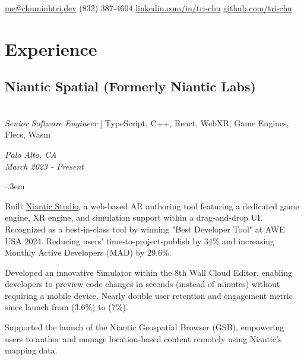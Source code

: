 \documentclass{article}
\makeatletter
\def\faEmail{{\FAFR \symbol{"F0E0}}} %
\def\faPhone{{\FAFR \symbol{"F095}}} %
\def\faLinkedin{{\FAB \symbol{"F08C}}} %
\def\faGithub{{\FAB \symbol{"F09B}}} %
\let\olditemize=\itemize \let\endolditemize=\enditemize
\renewenvironment{itemize}{\olditemize[topsep=0em] \itemsep-.3em}{\endolditemize}
\newcommand{\link}[1]{\href{https://#1}{#1}}
\newenvironment{twocolentry}[2][]{
    \def\secondColumn{#2}
    \raggedright
    \setcolumnwidth{\fill, 6cm}
    \begin{paracol}{2}
}{
    \switchcolumn \raggedleft \secondColumn
    \end{paracol}
} %
\renewcommand{\maketitle}{
  \begin{flushleft}
    \Huge\bfseries\theauthor
  \end{flushleft}
  \begin{bfseries}
    \faEmail    \hspace{1pt} \href{mailto:me@chuminhtri.dev}{me@chuminhtri.dev} \quad
    \faPhone    \hspace{1pt} (832) 387-4604 \quad
    \faLinkedin \hspace{1pt} \link{linkedin.com/in/tri-chu} \quad
    \faGithub   \hspace{1pt} \link{github.com/tri-chu}
  \end{bfseries}
}
\makeatother
\begin{document}
\author{\color{accentcolor}Tri Chu}
\maketitle


\section{Experience}

\begin{twocolentry}{
  \textit{Palo Alto, CA} \\
  \textit{March 2023 - Present}
}
\subsection{Niantic Spatial (Formerly Niantic Labs)}\hfill\\
\textit{Senior Software Engineer} | TypeScript, C++, React, WebXR, Game Engines, Flecs, Wasm 
\end{twocolentry}

\begin{itemize}
  \item Built
  \href{https://www.8thwall.com/blog/post/170524048722/introducing-niantic-studio}{Niantic Studio},
  a web-based AR authoring tool featuring a dedicated game engine, XR engine, and simulation support
  within a drag-and-drop UI. Recognized as a best-in-class tool by winning "Best Developer Tool" at
  AWE USA 2024. Reducing users’ time-to-project-publish by 34\% and increasing Monthly Active
  Developers (MAD) by 29.6\%.
  \item Developed an innovative Simulator within the 8th Wall Cloud Editor, enabling developers to
  preview code changes in seconds (instead of minutes) without requiring a mobile device. Nearly
  double user retention and engagement metric since launch from (3.6\%) to (7\%).
  \item Supported the launch of the Niantic Geospatial Browser (GSB), empowering users to author and
  manage location-based content remotely using Niantic’s mapping data.
\end{itemize}
\end{document}

